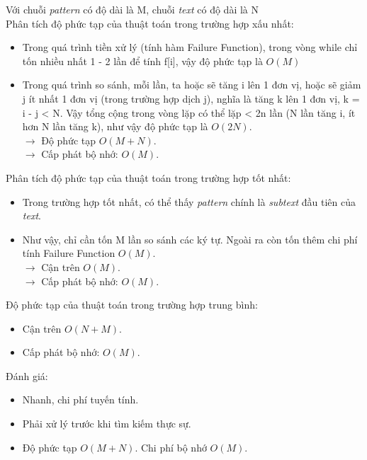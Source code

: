 \documentclass[a4paper,11pt]{article}
\begin{document}
			Với chuỗi \textit{pattern} có độ dài là M, chuỗi \textit{text} có độ dài là N \\
			Phân tích độ phức tạp của thuật toán trong trường hợp xấu nhất:
			\begin{itemize}
				\item Trong quá trình tiền xử lý (tính hàm Failure Function), trong vòng while chỉ tốn nhiều nhất 1 - 2 lần để tính f[i], vậy độ 
				phức tạp là $O(M)$
				\item Trong quá trình so sánh, mỗi lần, ta hoặc sẽ tăng i lên 1 đơn vị, hoặc sẽ giảm j ít nhất 1 đơn vị (trong trường hợp dịch j), nghĩa là tăng k lên 1 đơn vị, k = i - j < N.
				Vậy tổng cộng trong vòng lặp có thể lặp < 2n lần (N lần tăng i, ít hơn N lần tăng k), như vậy độ phức tạp là $O(2N)$.\\
				$\to$ Độ phức tạp $O(M + N)$.\\
				$\to$ Cấp phát bộ nhớ: $O(M)$.
			\end{itemize}

			Phân tích độ phức tạp của thuật toán trong trường hợp tốt nhất:
			\begin{itemize}
				\item Trong trường hợp tốt nhất, có thể thấy \textit{pattern} chính là \textit{subtext} đầu tiên của \textit{text}.
				\item Như vậy, chỉ cần tốn M lần so sánh các ký tự. Ngoài ra còn tốn thêm chi phí tính Failure Function $O(M)$.\\
				$\to$ Cận trên $O(M)$. \\
				$\to$ Cấp phát bộ nhớ: $O(M)$.
			\end{itemize}

			Độ phức tạp của thuật toán trong trường hợp trung bình:
			\begin{itemize}
				\item Cận trên $O(N + M)$.
				\item Cấp phát bộ nhớ: $O(M)$.
			\end{itemize}

			Đánh giá:
			\begin{itemize}
				\item Nhanh, chi phí tuyến tính.
				\item Phải xử lý trước khi tìm kiếm thực sự.
				\item Độ phức tạp $O(M + N)$. Chi phí bộ nhớ $O(M)$.
			\end{itemize}
\end{document}
